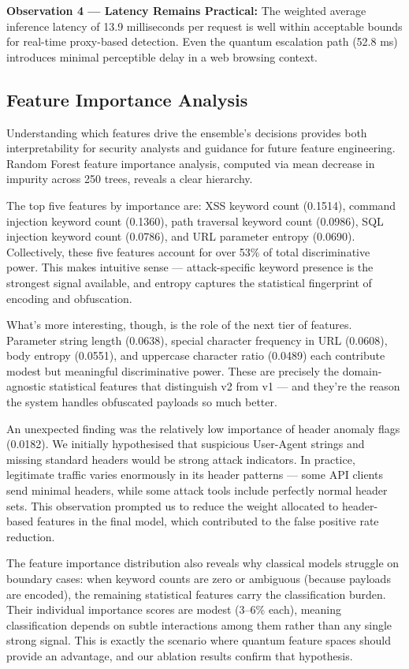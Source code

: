 \documentclass[journal,onecolumn]{IEEEtran}
\begin{document}
\textbf{Observation 4 --- Latency Remains Practical:} The weighted average inference latency of 13.9 milliseconds per request is well within acceptable bounds for real-time proxy-based detection. Even the quantum escalation path (52.8 ms) introduces minimal perceptible delay in a web browsing context.

\subsection{Feature Importance Analysis}

Understanding which features drive the ensemble's decisions provides both interpretability for security analysts and guidance for future feature engineering. Random Forest feature importance analysis, computed via mean decrease in impurity across 250 trees, reveals a clear hierarchy.

The top five features by importance are: XSS keyword count (0.1514), command injection keyword count (0.1360), path traversal keyword count (0.0986), SQL injection keyword count (0.0786), and URL parameter entropy (0.0690). Collectively, these five features account for over 53\% of total discriminative power. This makes intuitive sense --- attack-specific keyword presence is the strongest signal available, and entropy captures the statistical fingerprint of encoding and obfuscation.

What's more interesting, though, is the role of the next tier of features. Parameter string length (0.0638), special character frequency in URL (0.0608), body entropy (0.0551), and uppercase character ratio (0.0489) each contribute modest but meaningful discriminative power. These are precisely the domain-agnostic statistical features that distinguish v2 from v1 --- and they're the reason the system handles obfuscated payloads so much better.

An unexpected finding was the relatively low importance of header anomaly flags (0.0182). We initially hypothesised that suspicious User-Agent strings and missing standard headers would be strong attack indicators. In practice, legitimate traffic varies enormously in its header patterns --- some API clients send minimal headers, while some attack tools include perfectly normal header sets. This observation prompted us to reduce the weight allocated to header-based features in the final model, which contributed to the false positive rate reduction.

The feature importance distribution also reveals why classical models struggle on boundary cases: when keyword counts are zero or ambiguous (because payloads are encoded), the remaining statistical features carry the classification burden. Their individual importance scores are modest (3--6\% each), meaning classification depends on subtle interactions among them rather than any single strong signal. This is exactly the scenario where quantum feature spaces should provide an advantage, and our ablation results confirm that hypothesis.
\end{document}

